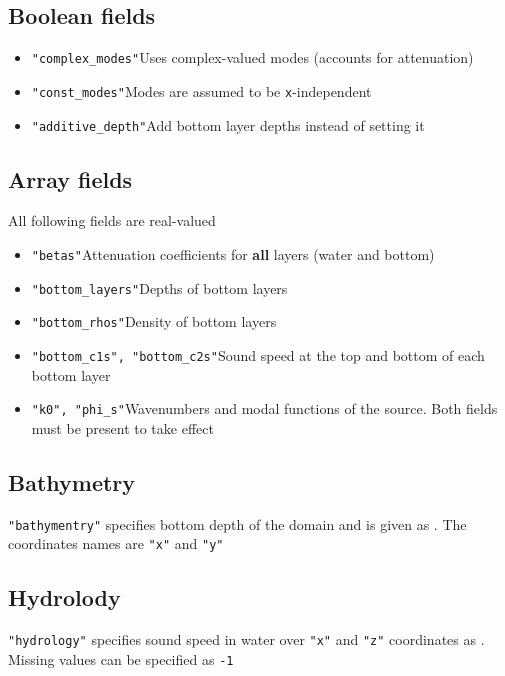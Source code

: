 \documentclass[12pt]{extarticle}
\newcommand{\code}[1]{\colorbox{gray!10}{\texttt{#1}}}
\begin{document}
        \subsection{Boolean fields}
            \begin{itemize}
                \item\code{"complex_modes"}\qquad Uses complex-valued modes (accounts for attenuation)
                \item\code{"const_modes"}\qquad Modes are assumed to be \code{x}-independent
                \item\code{"additive_depth"}\qquad Add bottom layer depths instead of setting it
            \end{itemize}
        \subsection{Array fields}
            \par All following fields are real-valued
            \begin{itemize}
                \item\code{"betas"}\qquad Attenuation coefficients for \textbf{all} layers (water and bottom)
                \item\code{"bottom_layers"}\qquad Depths of bottom layers
                \item\code{"bottom_rhos"}\qquad Density of bottom layers
                \item\code{"bottom_c1s", "bottom_c2s"}\qquad Sound speed at the top and bottom of each bottom layer
                \item\code{"k0", "phi_s"}\qquad Wavenumbers and modal functions of the source. Both fields must be present to take effect
            \end{itemize}
        \subsection{Bathymetry}
            \par \code{"bathymentry"} specifies bottom depth of the domain and is given as . The coordinates names are \code{"x"} and \code{"y"}
        \subsection{Hydrolody}
            \par \code{"hydrology"} specifies sound speed in water over \code{"x"} and \code{"z"} coordinates as . Missing values can be specified as \code{-1}
\end{document}
